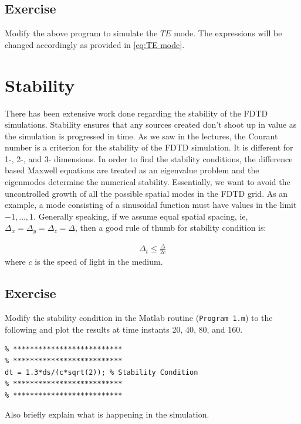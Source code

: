 \documentclass[12pt]{article}
\begin{document}
\subsection*{Exercise}

\begin{mdframed}[backgroundcolor=blue!20]
  Modify the above program to simulate the $TE$ mode. The expressions will be changed accordingly as provided in \eqref{eq:TE mode}.
\end{mdframed}


\section{Stability}

There has been extensive work done regarding the stability of the FDTD simulations. Stability ensures that any sources created don't shoot up in value as the simulation is progressed in time. As we saw in the lectures, the Courant number is a criterion for the stability of the FDTD simulation. It is different for 1-, 2-, and 3- dimensions. In order to find the stability conditions, the difference based Maxwell equations are treated as an eigenvalue problem and the eigenmodes determine the numerical stability. Essentially, we want to avoid the uncontrolled growth of all the possible spatial modes in the FDTD grid. As an example, a mode consisting of a sinusoidal function must have values in the limit $-1, \dots, 1$. Generally speaking, if we assume equal spatial spacing, ie, $\Delta_x = \Delta_y = \Delta_z = \Delta$, then a good rule of thumb for stability condition is:

\begin{align}
  \Delta_t \le \frac{\Delta}{2c}
\end{align}
where $c$ is the speed of light in the medium.

\subsection*{Exercise}

\begin{mdframed}[backgroundcolor=blue!20]

  Modify the stability condition in the Matlab routine (\texttt{Program 1.m}) to the following and plot the results at time instants 20, 40, 80, and 160.
  \scriptsize
  \begin{verbatim}
% **************************
% **************************
dt = 1.3*ds/(c*sqrt(2)); % Stability Condition
% **************************
% **************************
  \end{verbatim}
\end{mdframed}
Also briefly explain what is happening in the simulation.
\end{document}
